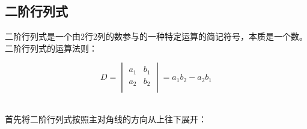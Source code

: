 \documentclass[UTF8]{ctexart}
\begin{document}
\subsection{二阶行列式}
    \setcounter{equation}{0}
    二阶行列式是一个由$2$行$2$列的数参与的一种特定运算的简记符号，本质是一个数。\\[3mm]
    二阶行列式的运算法则：
    \begin{large}
        \begin{equation*}
            D=
            \begin{vmatrix}
                a_1&b_1\\
                a_2&b_2\\
            \end{vmatrix}
            =a_1b_2-a_2b_1
        \end{equation*}
    \end{large}\\[3mm]
    首先将二阶行列式按照主对角线的方向从上往下展开：
\end{document}
